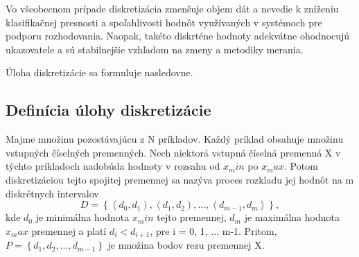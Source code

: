 Vo všeobecnom prípade diskretizácia zmenšuje objem dát a nevedie k zníženiu klasifikačnej presnosti a spoľahlivosti hodnôt  využívaných v systémoch pre podporu rozhodovania. Naopak, takéto diskrténe hodnoty adekvátne ohodnocujú ukazovatele a sú stabilnejšie vzhľadom na zmeny a metodiky merania. 
\cite{levashenkoProj, Lui2002}

Úloha diskretizácie sa formuluje nasledovne. 
\subsection{Definícia úlohy diskretizácie}
Majme množinu pozostávajúcu z N príkladov. Každý príklad obsahuje množinu vstupných číselných premenných. Nech niektorá vstupná číselná premenná X v týchto príkladoch nadobúda hodnoty v rozsahu od $x_min$ po $x_max$. Potom diskretizáciou tejto spojitej premennej sa nazýva proces rozkladu jej hodnôt na m diskrétnych intervalov
\begin{equation}\label{dkiskr}
D =\left\lbrace
\left\langle d_0, d_1 \right) , 
\left\langle d_1, d_2 \right) , ... , 
\left\langle d_{m-1}, d_m \right\rangle 
 \right\rbrace, 
\end{equation} 
kde $d_0$ je minimálna hodnota $x_min$ tejto premennej, $d_m$ je maximálna hodnota $x_max$ premennej a platí $d_i < d_{i+1}$, pre i = 0, 1, ... m-1. 
Pritom, $P = \left\lbrace d_1, d_2, ..., d_{m-1} \right\rbrace$ je množina bodov rezu premennej X.    \cite{levashenkoProj, Garcia2013}



